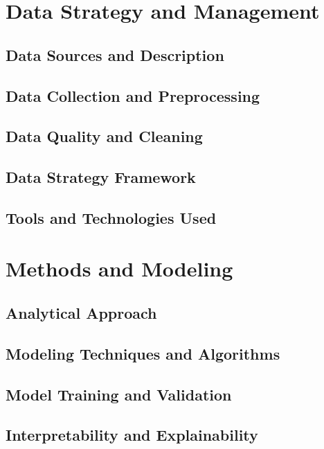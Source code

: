 \documentclass[11pt,a4paper]{article}
\begin{document}
\section{Data Strategy and Management}

\subsection{Data Sources and Description}

\subsection{Data Collection and Preprocessing}

\subsection{Data Quality and Cleaning}

\subsection{Data Strategy Framework}

\subsection{Tools and Technologies Used}


\section{Methods and Modeling}

\subsection{Analytical Approach}

\subsection{Modeling Techniques and Algorithms}

\subsection{Model Training and Validation}

\subsection{Interpretability and Explainability}
\end{document}
